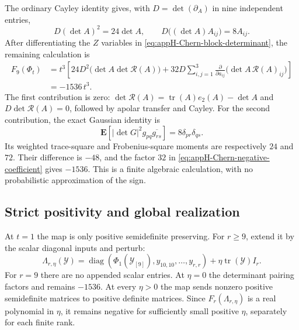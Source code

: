 The ordinary Cayley identity
\cite[Theorem~2.1; printed p.~477]{CaraccioloSokalSportiello13CayleyPublished}
gives, with $D=\det(\partial_A)$ in nine independent entries,
\[
 D(\det A)^2=24\det A,\qquad
 D\bigl((\det A)A_{ij}\bigr)=8A_{ij}.
\]
After differentiating the $Z$ variables in
\eqref{eq:appH-Chern-block-determinant}, the remaining calculation is
\begin{equation*}
 \begin{aligned}
 F_9(\Phi_t)
  &=t^3\left[
      24D^2\bigl(\det A\det\mathcal R(A)\bigr)
       +32D\sum_{i,j=1}^3
          \frac{\partial}{\partial a_{ij}}
             \bigl(\det A\,\mathcal R(A)_{ij}\bigr)\right]\\
  &=-1536\,t^3 .
 \end{aligned}
 \tag{H.31}\label{eq:appH-Chern-negative-coefficient}
\end{equation*}
The first contribution is zero: $\det\mathcal R(A)
=\operatorname{tr}(A)e_2(A)-\det A$ and
$D\det\mathcal R(A)=0$, followed by apolar transfer and Cayley.
For the second contribution, the exact Gaussian identity is
\[
 \mathbf E\!\left[
 |\det G|^2 g_{pq}\overline{g_{rs}}\right]
      =8\delta_{pr}\delta_{qs}.
\]
Its weighted trace-square and Frobenius-square moments are respectively
$24$ and $72$. Their difference is $-48$, and the factor $32$ in
\eqref{eq:appH-Chern-negative-coefficient} gives $-1536$.
This is a finite algebraic calculation, with no probabilistic
approximation of the sign.

\subsection{Strict positivity and global realization}
\label{sec:appH-Chern-global}

At $t=1$ the map is only positive semidefinite preserving. For
$r\geq9$, extend it by the scalar diagonal inputs and perturb:
\begin{equation*}
 \Lambda_{r,\eta}(\mathcal Y)=
 \operatorname{diag}\!\left(
    \Phi_1(\mathcal Y_{[9]}),y_{10,10},\ldots,y_{r,r}\right)
       +\eta\operatorname{tr}(\mathcal Y)I_r .
 \tag{H.32}\label{eq:appH-Chern-strict-perturbation}
\end{equation*}
For $r=9$ there are no appended scalar entries. At $\eta=0$ the
determinant pairing factors and remains $-1536$. At every $\eta>0$
the map sends nonzero positive semidefinite matrices to positive
definite matrices. Since $F_r(\Lambda_{r,\eta})$ is a real polynomial
in $\eta$, it remains negative for sufficiently small positive
$\eta$, separately for each finite rank.

